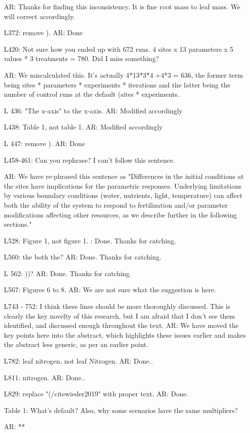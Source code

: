 \documentclass{article}
\begin{document}
\textsf{AR: Thanks for finding this inconsistency. It is fine root mass to leaf mass. We will correct accordingly}. 

L372: remove ). 
\textsf{AR: Done}

L420: Not sure how you ended up with 672 runs. 4 sites x 13 parameters x 5 values * 3 treatments = 780. Did I miss something? 

\textsf{AR: We miscalculated this. It's actually 4*13*3*4 +4*3 = 636, the former term being sites * parameters * experiments * iterations and the latter being the number of control runs at the default (sites * experiments.}

L 436: "The x-axis" to the x-axis. 
\textsf{AR: Modified accordingly}

L438: Table 1, not table 1. 
\textsf{AR: Modified accordingly}

L 447: remove ). 
\textsf{AR: Done}

L458-461: Can you rephrase? I can't follow this sentence. 

\textsf{AR: We have re-phrased this sentence as "Differences in the initial conditions at the sites have implications for the parametric responses. Underlying limitations by various boundary conditions (water, nutrients, light, temperature) can affect both the ability of the system to respond to fertilization and/or parameter modifications affecting other resources, as we describe further in the following sections."}

L528: Figure 1, not figure 1. 
\textsf{: Done. Thanks for catching. }

L560: the both the? 
\textsf{AR: Done. Thanks for catching.} 
 
L 562: ))? 
\textsf{AR: Done. Thanks for catching.} 

L567: Figures 6 to 8. 
\textsf{AR: We are not sure what the suggestion is here. }

L743 - 752: I think these lines should be more thoroughly discussed. This is clearly the key novelty of this research, but I am afraid that I don't see them identified, and discussed enough throughout the text. 
\textsf{AR: We have moved the key points here into the abstract, which highlights these issues earlier and makes the abstract less generic, as per an earlier point.}

L782: leaf nitrogen, not leaf Nitrogen. 
\textsf{AR: Done..} 

L811: nitrogen. 
\textsf{AR: Done..} 

L829: replace "(/citewieder2019" with proper text. 
\textsf{AR: Done.} 

Table 1: What's default? Also, why some scenarios have the same multipliers? 

\textsf{AR: ** }
\end{document}
